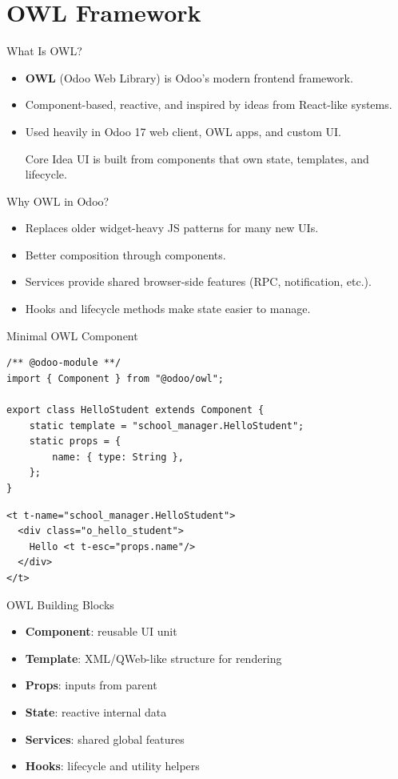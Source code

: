 \section{OWL Framework}

\begin{frame}{What Is OWL?}
	\begin{itemize}
		\item \textbf{OWL} (Odoo Web Library) is Odoo's modern frontend framework.
		\item Component-based, reactive, and inspired by ideas from React-like systems.
		\item Used heavily in Odoo 17 web client, OWL apps, and custom UI.
\begin{block}{Core Idea}
	UI is built from components that own state, templates, and lifecycle.
\end{block}
	\end{itemize}
\end{frame}

\begin{frame}[fragile]{Why OWL in Odoo?}
	\begin{itemize}
		\item Replaces older widget-heavy JS patterns for many new UIs.
		\item Better composition through components.
		\item Services provide shared browser-side features (RPC, notification, etc.).
		\item Hooks and lifecycle methods make state easier to manage.
	\end{itemize}
\end{frame}

\begin{frame}[fragile]{Minimal OWL Component}
\begin{lstlisting}[style=js]
/** @odoo-module **/
import { Component } from "@odoo/owl";

export class HelloStudent extends Component {
	static template = "school_manager.HelloStudent";
	static props = {
		name: { type: String },
	};
}
\end{lstlisting}
\begin{lstlisting}[style=xml]
<t t-name="school_manager.HelloStudent">
  <div class="o_hello_student">
	Hello <t t-esc="props.name"/>
  </div>
</t>
\end{lstlisting}
\end{frame}

\begin{frame}[fragile]{OWL Building Blocks}
	\begin{itemize}
		\item \textbf{Component}: reusable UI unit
		\item \textbf{Template}: XML/QWeb-like structure for rendering
		\item \textbf{Props}: inputs from parent
		\item \textbf{State}: reactive internal data
		\item \textbf{Services}: shared global features
		\item \textbf{Hooks}: lifecycle and utility helpers
	\end{itemize}
\end{frame}

